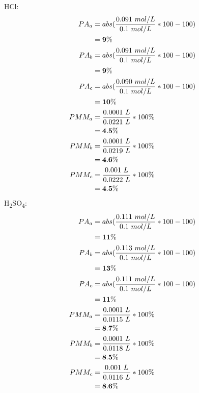 \documentclass[10pt,twoside]{report}
\begin{document}
\begin{multicols}{2}
    HCl:\\
    \begin{equation*}
        \begin{split}
            PA_a &= abs(\frac{0.091\ mol/L}{0.1\ mol/L}*100-100)\\
                &= \bold{9\%} \\
            PA_b &= abs(\frac{0.091\ mol/L}{0.1\ mol/L}*100-100)\\
                &= \bold{9\%} \\
            PA_c &= abs(\frac{0.090\ mol/L}{0.1\ mol/L}*100-100)\\
                &= \bold{10\%} \\
            PMM_a &= \frac{0.0001\ L}{0.0221\ L}*100\%\\
                &= \bold{4.5\%}\\
            PMM_b &= \frac{0.0001\ L}{0.0219\ L}*100\%\\
                &= \bold{4.6\%}\\
            PMM_c &= \frac{0.001\ L}{0.0222\ L}*100\%\\
                &= \bold{4.5\%}\\
        \end{split}
    \end{equation*}
\break
    H\textsubscript{2}SO\textsubscript{4}:\\
    \begin{equation*}
        \begin{split}
            PA_a &= abs(\frac{0.111\ mol/L}{0.1\ mol/L}*100-100)\\
                &= \bold{11\%} \\
            PA_b &= abs(\frac{0.113\ mol/L}{0.1\ mol/L}*100-100)\\
                &= \bold{13\%} \\
            PA_c &= abs(\frac{0.111\ mol/L}{0.1\ mol/L}*100-100)\\
                &= \bold{11\%} \\
            PMM_a &= \frac{0.0001\ L}{0.0115\ L}*100\%\\
                &= \bold{8.7\%}\\
            PMM_b &= \frac{0.0001\ L}{0.0118\ L}*100\%\\
                &= \bold{8.5\%}\\
            PMM_c &= \frac{0.001\ L}{0.0116\ L}*100\%\\
                &= \bold{8.6\%}\\
        \end{split}
    \end{equation*}
\end{multicols}
\end{document}
